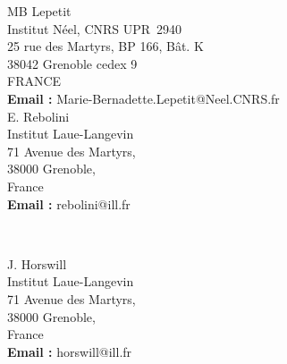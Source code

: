\noindent 
\begin{minipage}{10cm}
  MB Lepetit \\
  Institut Néel, CNRS UPR~2940 \\                       
  25 rue des Martyrs, BP 166, Bât. K\\
  38042 Grenoble cedex 9 \\
  FRANCE \\[+1ex]                                          
  {\bf Email :} Marie-Bernadette.Lepetit@Neel.CNRS.fr
\\
  E. Rebolini \\
  Institut Laue-Langevin\\            
  71 Avenue des Martyrs,\\  
  38000 Grenoble,\\
  France\\[+1ex]                                          
  {\bf Email :} rebolini@ill.fr  \\
\end{minipage} \hfill 
\\
\begin{minipage}{8cm}
  J. Horswill \\
  Institut Laue-Langevin\\            
  71 Avenue des Martyrs,\\  
  38000 Grenoble,\\
  France\\[+1ex]                                          
  {\bf Email :} horswill@ill.fr  
\end{minipage}
      





%
%
%

